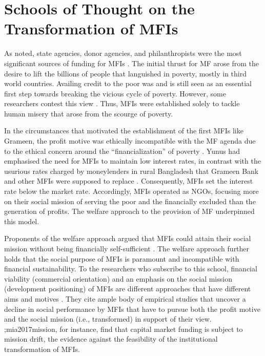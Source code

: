 \documentclass[a4paper, nobind]{templates/ociamthesis}
\begin{document}
\hypertarget{schools-of-thought-on-the-transformation-of-mfis}{%
\section{Schools of Thought on the Transformation of MFIs}\label{schools-of-thought-on-the-transformation-of-mfis}}

\noindent As noted, state agencies, donor agencies, and philanthropists were the most significant sources of funding for MFIs \autocite{ledgerwood1998microfinance,ledgerwood2006transforming}. The initial thrust for MF arose from the desire to lift the billions of people that languished in poverty, mostly in third world countries. Availing credit to the poor was and is still seen as an essential first step towards breaking the vicious cycle of poverty. However, some researchers contest this view \autocite{bateman2010doesn,adams2016microfinance,onyuma2005myths}. Thus, MFIs were established solely to tackle human misery that arose from the scourge of poverty.

In the circumstances that motivated the establishment of the first MFIs like Grameen, the profit motive was ethically incompatible with the MF agenda \autocite{ghosh2013microfinance,la2006new} due to the ethical concern around the ``financialization'' of poverty \autocite{mader2015financialization}. Yunus had emphasised the need for MFIs to maintain low interest rates, in contrast with the usurious rates charged by moneylenders in rural Bangladesh that Grameen Bank and other MFIs were supposed to replace \autocite{bateman2010doesn}. Consequently, MFIs set the interest rate below the market rate. Accordingly, MFIs operated as NGOs, focusing more on their social mission of serving the poor and the financially excluded than the generation of profits. The welfare approach to the provision of MF underpinned this model.

Proponents of the welfare approach argued that MFIs could attain their social mission without being financially self-sufficient \autocite{kodongo2013individual}. The welfare approach further holds that the social purpose of MFIs is paramount and incompatible with financial sustainability. To the researchers who subscribe to this school, financial viability (commercial orientation) and an emphasis on the social mission (development positioning) of MFIs are different approaches that have different aims and motives \autocite{toindepi2016investigating}. They cite ample body of empirical studies that uncover a decline in social performance by MFIs that have to pursue both the profit motive and the social mission (i.e., transformed) in support of their view. \textcite{bos2015practice} ;mia2017mission, for instance, find that capital market funding is subject to mission drift, the evidence against the feasibility of the institutional transformation of MFIs.
\end{document}
